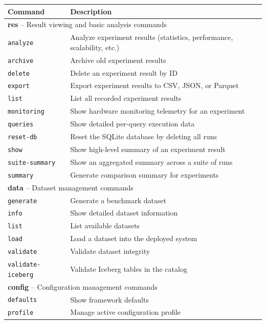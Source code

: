 \begin{table}[H]
\centering
\small
\begin{tabular}{p{2.5cm}p{11.5cm}}
\hline
\textbf{Command} & \textbf{Description} \\
\hline
\multicolumn{2}{l}{\textbf{res} -- Result viewing and basic analysis commands} \\
\hline
\texttt{analyze}   & Analyze experiment results (statistics, performance, scalability, etc.) \\
\texttt{archive}   & Archive old experiment results \\
\texttt{delete}    & Delete an experiment result by ID \\
\texttt{export}    & Export experiment results to CSV, JSON, or Parquet \\
\texttt{list}      & List all recorded experiment results \\
\texttt{monitoring} & Show hardware monitoring telemetry for an experiment \\
\texttt{queries}   & Show detailed per-query execution data \\
\texttt{reset-db}  & Reset the SQLite database by deleting all runs \\
\texttt{show}      & Show high-level summary of an experiment result \\
\texttt{suite-summary} & Show an aggregated summary across a suite of runs \\
\texttt{summary}   & Generate comparison summary for experiments \\
\hline
\multicolumn{2}{l}{\textbf{data} -- Dataset management commands} \\
\hline
\texttt{generate}  & Generate a benchmark dataset \\
\texttt{info}      & Show detailed dataset information \\
\texttt{list}      & List available datasets \\
\texttt{load}      & Load a dataset into the deployed system \\
\texttt{validate}  & Validate dataset integrity \\
\texttt{validate-iceberg} & Validate Iceberg tables in the catalog \\
\hline
\multicolumn{2}{l}{\textbf{config} -- Configuration management commands} \\
\hline
\texttt{defaults}  & Show framework defaults \\
\texttt{profile}   & Manage active configuration profile \\

\end{tabular}
\end{table}
